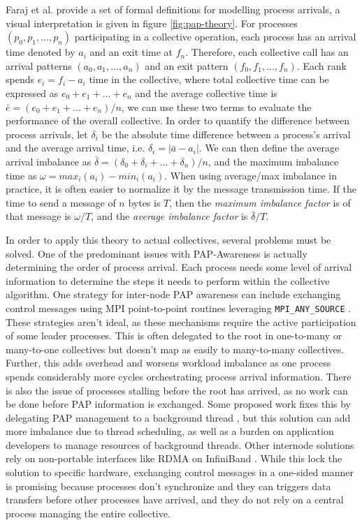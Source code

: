 Faraj et al. \cite{Faraj2008StudyProcArrivalMPIColl} provide a set of formal definitions for modelling process arrivals, a visual interpretation is given in figure \ref{fig:pap-theory}.
For processes $(p_0, p_1,...,p_n)$ participating in a collective operation, each process has an arrival time denoted by $a_i$ and an exit time at $f_n$.
Therefore, each collective call has an arrival patterns $(a_0, a_1, ..., a_n)$ and an exit pattern $(f_0, f_1, ..., f_n)$.
Each rank spends $e_i = f_i - a_i$ time in the collective, where total collective time can be expressed as $e_0 + e_1 + ... + e_n$ and the average collective time is $\bar{e} = (e_0 + e_1 + ... + e_n)/n$, we can use these two terms to evaluate the performance of the overall collective.
In order to quantify the difference between process arrivals, let $\delta_i$ be the absolute time difference between a process's arrival and the average arrival time, i.e. $\delta_i = |\bar{a} - a_i|$. 
We can then define the average arrival imbalance as $\bar{\delta}=(\delta_0 + \delta_i + ... + \delta_n)/n$, and the maximum imbalance time as $\omega = max_i(a_i)-min_i(a_i)$.
When using average/max imbalance in practice, it is often easier to normalize it by the message transmission time.
If the time to send a message of $n$ bytes is $T$, then the \textit{maximum imbalance factor} is of that message is $\omega/T$, and the \textit{average imbalance factor} is $\bar{\delta}/T$.

In order to apply this theory to actual collectives, several problems must be solved.
One of the predominant issues with PAP-Awareness is actually determining the order of process arrival.
Each process needs some level of arrival information to determine the steps it needs to perform within the collective algorithm. 
One strategy for inter-node PAP awareness can include exchanging control messages using MPI point-to-point routines leveraging \texttt{MPI\_ANY\_SOURCE} \cite{Patarasuk2008EffBcastDifProcArr}.
These strategies aren't ideal, as these mechanisms require the active participation of some leader processes.
This is often delegated to the root in one-to-many or many-to-one collectives but doesn't map as easily to many-to-many collectives.
Further, this adds overhead and worsens workload imbalance as one process spends considerably more cycles orchestrating process arrival information.
There is also the issue of processes stalling before the root has arrived, as no work can be done before PAP information is exchanged.
Some proposed work fixes this by delegating PAP management to a background thread \cite{Proficz2018ImprvAllReduceForImbPAP, Proficz2020PAPAwareScatterGather, Proficz2021AllGatherResilientToImbPAP, Faraj2008StudyProcArrivalMPIColl}, but this solution can add more imbalance due to thread scheduling, as well as a burden on application developers to manage resources of background threads.
Other internode solutions rely on non-portable interfaces like RDMA on InfiniBand \cite{Qian2009ProcArrivalSHMA2AIB}.
While this lock the solution to specific hardware, exchanging control messages in a one-sided manner is promising because processes don't synchronize and they can triggers data transfers before other processes have arrived, and they do not rely on a central process managing the entire collective. 

